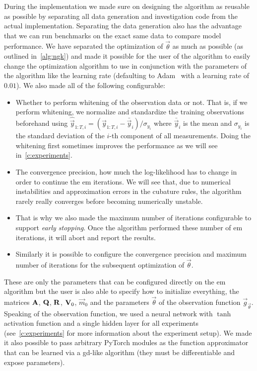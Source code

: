 	During the implementation we made sure on designing the algorithm as reusable as possible by separating all data generation and investigation code from the actual implementation. Separating the data generation also has the advantage that we can run benchmarks on the exact same data to compare model performance. We have separated the optimization of \(\vec{\theta}\) as much as possible (as outlined in~\autoref{alg:ngk}) and made it possible for the user of the algorithm to easily change the optimization algorithm to use in conjunction with the parameters of the algorithm like the learning rate (defaulting to Adam~\cite{kingmaAdamMethodStochastic2017} with a learning rate of \( 0.01 \)). We also made all of the following configurable:
	\begin{itemize}
		\item Whether to perform whitening of the observation data or not. That is, if we perform whitening, we normalize and standardize the training observations beforehand using \( \hat{\vec{y}}_{1:T, i} = (\vec{y}_{1:T, i} - \bar{\vec{y}}_i) / \sigma_{y_i} \) where \( \bar{\vec{y}}_i \) is the mean and \( \sigma_{y_i} \) is the standard deviation of the \(i\)-th component of all measurements. Doing the whitening first sometimes improves the performance as we will see in~\autoref{c:experiments}.
		\item The convergence precision, \ie how much the log-likelihood has to change in order to continue the \ac{em} iterations. We will see that, due to numerical instabilities and approximation errors in the cubature rules, the algorithm rarely really converges before becoming numerically unstable.
		\item[] That is why we also made the maximum number of iterations configurable to support \emph{early stopping}. Once the algorithm performed these number of \ac{em} iterations, it will abort and report the results.
		\item Similarly it is possible to configure the convergence precision and maximum number of iterations for the subsequent optimization of \(\vec{\theta}\).
	\end{itemize}
	These are only the parameters that can be configured directly on the \ac{em} algorithm but the user is also able to specify how to initialize everything, \ie the matrices \( \boldsymbol{\mathrm{A}} \), \( \boldsymbol{\mathrm{Q}} \), \( \boldsymbol{\mathrm{R}} \), \( \boldsymbol{\mathrm{V}}_0 \), \( \vec{m}_0 \) and the parameters \( \vec{\theta} \) of the observation function \( \vec{g}_{\vec{\theta}} \). Speaking of the observation function, we used a neural network with \( \tanh \) activation function and a single hidden layer for all experiments (see~\autoref{c:experiments} for more information about the experiment setup). We made it also possible to pass arbitrary PyTorch modules as the function approximator that can be learned via a \ac{gd}-like algorithm (\ie they must be differentiable and expose parameters).


